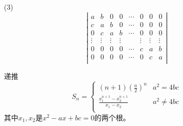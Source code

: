 \begin{itemize}
\begin{itemize}
        \item[(3)]
        \begin{equation}
        \nonumber
        \left|
            \begin{array}{cccccccc}
            a       &b     &0       &0      &\cdots & 0 &0 &0\\
            c       &a     &b     &0      &\cdots & 0 &0 &0\\
            0       &c     &a      &b    &\cdots & 0 &0 &0\\
            \vdots  &\vdots  &\vdots  &\vdots &       & \vdots & \vdots &\vdots\\
            0       &0       &0       &0      &\cdots & c &a &b\\
            0       &0       &0       &0      &\cdots & 0 &c &a\\
            \end{array}
        \right|
        \end{equation} 
		\begin{solution}
		递推
		\begin{equation}
		\nonumber
		S_n = \left\{
			\begin{array}{ll}
			(n+1)\left(\frac{a}{2}\right)^n& a^2 = 4bc\\
			\frac{x_1^{n+1} - x_2^{n+1}}{x_1 - x_2}& a^2 \ne 4bc\\
			\end{array}
		\right.
		\end{equation}
		其中$x_1, x_2$是$x^2 - ax + bc = 0$的两个根。
		\end{solution}
        \vspace{2cm}
    \end{itemize}


\end{itemize}
